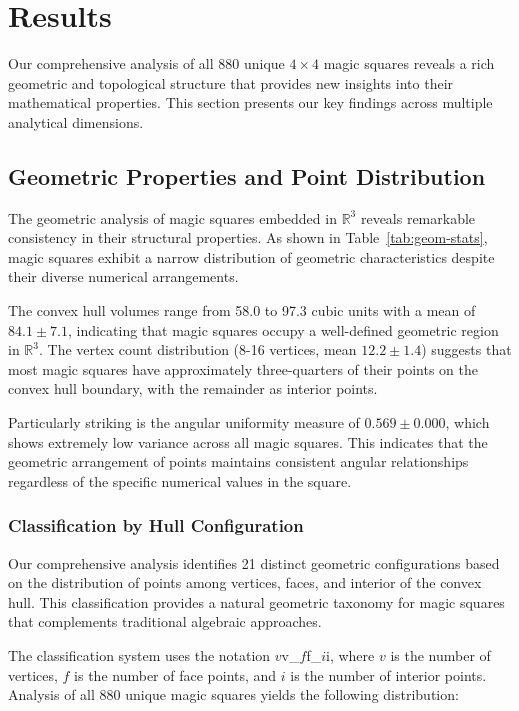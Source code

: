 \section{Results}\label{sec:results}

Our comprehensive analysis of all 880 unique $4 \times 4$ magic squares reveals a rich geometric and topological structure that provides new insights into their mathematical properties. This section presents our key findings across multiple analytical dimensions.

\subsection{Geometric Properties and Point Distribution}

The geometric analysis of magic squares embedded in $\mathbb{R}^3$ reveals remarkable consistency in their structural properties. As shown in Table~\ref{tab:geom-stats}, magic squares exhibit a narrow distribution of geometric characteristics despite their diverse numerical arrangements.

The convex hull volumes range from 58.0 to 97.3 cubic units with a mean of $84.1 \pm 7.1$, indicating that magic squares occupy a well-defined geometric region in $\mathbb{R}^3$. The vertex count distribution (8-16 vertices, mean $12.2 \pm 1.4$) suggests that most magic squares have approximately three-quarters of their points on the convex hull boundary, with the remainder as interior points.

Particularly striking is the angular uniformity measure of $0.569 \pm 0.000$, which shows extremely low variance across all magic squares. This indicates that the geometric arrangement of points maintains consistent angular relationships regardless of the specific numerical values in the square.

\subsubsection{Classification by Hull Configuration}

Our comprehensive analysis identifies 21 distinct geometric configurations based on the distribution of points among vertices, faces, and interior of the convex hull. This classification provides a natural geometric taxonomy for magic squares that complements traditional algebraic approaches.

The classification system uses the notation $v$v\_$f$f\_$i$i, where $v$ is the number of vertices, $f$ is the number of face points, and $i$ is the number of interior points. Analysis of all 880 unique magic squares yields the following distribution:

